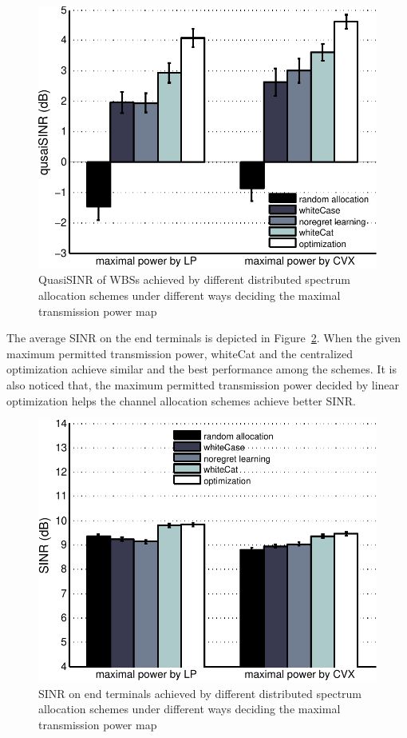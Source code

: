 \documentclass[times]{ettauth}
\theoremstyle{mytheoremstyle}
\theoremstyle{mytheoremstyle}
\theoremstyle{mytheoremstyle}
\begin{document}
   \begin{figure}[h!]
       \centering
       \includegraphics[width=0.7\linewidth]{qusaiSINR.pdf}
       \caption{QuasiSINR of WBSs achieved by different distributed spectrum allocation schemes under different ways deciding the maximal transmission power map}
	\label{qusaiSINR}
     \end{figure}
     
The average SINR on the end terminals is depicted in Figure~\ref{6000_sinr}.
When the given maximum permitted transmission power, whiteCat and the centralized optimization achieve similar and the best performance among the schemes.
It is also noticed that, the maximum permitted transmission power decided by linear optimization helps the channel allocation schemes achieve better SINR.
     \begin{figure}[h!]
       \centering
       \includegraphics[width=0.7\linewidth]{6000_sinr.pdf}
       \caption{SINR on end terminals achieved by different distributed spectrum allocation schemes under different ways deciding the maximal transmission power map}
	\label{6000_sinr}
     \end{figure}
\end{document}
